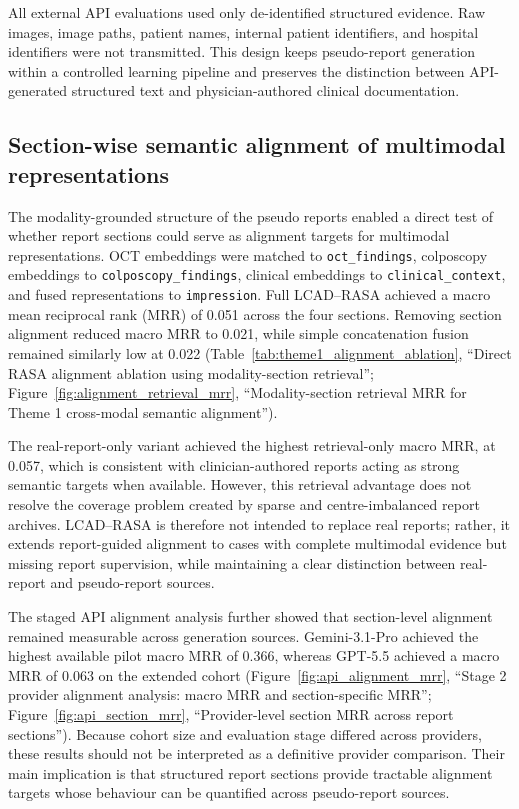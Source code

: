 All external API evaluations used only de-identified structured evidence. Raw images, image paths, patient names, internal patient identifiers, and hospital identifiers were not transmitted. This design keeps pseudo-report generation within a controlled learning pipeline and preserves the distinction between API-generated structured text and physician-authored clinical documentation.

\subsection{Section-wise semantic alignment of multimodal representations}
\label{subsec:alignment_results}

The modality-grounded structure of the pseudo reports enabled a direct test of whether report sections could serve as alignment targets for multimodal representations. OCT embeddings were matched to \texttt{oct\_findings}, colposcopy embeddings to \texttt{colposcopy\_findings}, clinical embeddings to \texttt{clinical\_context}, and fused representations to \texttt{impression}. Full LCAD--RASA achieved a macro mean reciprocal rank (MRR) of 0.051 across the four sections. Removing section alignment reduced macro MRR to 0.021, while simple concatenation fusion remained similarly low at 0.022 (Table~\ref{tab:theme1_alignment_ablation}, ``Direct RASA alignment ablation using modality-section retrieval''; Figure~\ref{fig:alignment_retrieval_mrr}, ``Modality-section retrieval MRR for Theme 1 cross-modal semantic alignment'').

The real-report-only variant achieved the highest retrieval-only macro MRR, at 0.057, which is consistent with clinician-authored reports acting as strong semantic targets when available. However, this retrieval advantage does not resolve the coverage problem created by sparse and centre-imbalanced report archives. LCAD--RASA is therefore not intended to replace real reports; rather, it extends report-guided alignment to cases with complete multimodal evidence but missing report supervision, while maintaining a clear distinction between real-report and pseudo-report sources.

The staged API alignment analysis further showed that section-level alignment remained measurable across generation sources. Gemini-3.1-Pro achieved the highest available pilot macro MRR of 0.366, whereas GPT-5.5 achieved a macro MRR of 0.063 on the extended cohort (Figure~\ref{fig:api_alignment_mrr}, ``Stage 2 provider alignment analysis: macro MRR and section-specific MRR''; Figure~\ref{fig:api_section_mrr}, ``Provider-level section MRR across report sections''). Because cohort size and evaluation stage differed across providers, these results should not be interpreted as a definitive provider comparison. Their main implication is that structured report sections provide tractable alignment targets whose behaviour can be quantified across pseudo-report sources.

